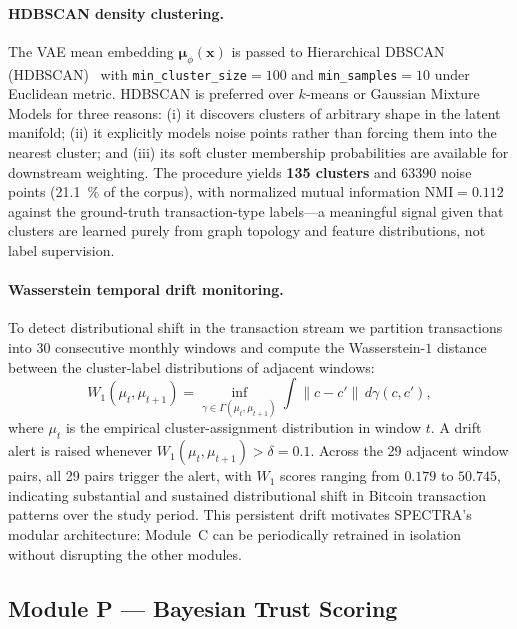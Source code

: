 \documentclass[journal]{IEEEtran}
\begin{document}
\paragraph{HDBSCAN density clustering.}
The VAE mean embedding $\boldsymbol{\mu}_\phi(\mathbf{x})$ is passed to
Hierarchical DBSCAN (HDBSCAN)~\cite{Campello2013} with
\texttt{min\_cluster\_size}$= 100$ and \texttt{min\_samples}$= 10$
under Euclidean metric.
HDBSCAN is preferred over $k$-means or Gaussian Mixture Models for three
reasons: (i) it discovers clusters of arbitrary shape in the latent manifold;
(ii) it explicitly models noise points rather than forcing them into the
nearest cluster; and (iii) its soft cluster membership probabilities are
available for downstream weighting.
The procedure yields \textbf{135 clusters} and
\num{63390} noise points (\SI{21.1}{\percent} of the corpus), with
normalized mutual information $\mathrm{NMI} = 0.112$ against the ground-truth
transaction-type labels—a meaningful signal given that clusters are learned
purely from graph topology and feature distributions, not label supervision.

\paragraph{Wasserstein temporal drift monitoring.}
To detect distributional shift in the transaction stream we partition
transactions into 30 consecutive monthly windows and compute the
Wasserstein-$1$ distance~\cite{Villani2009} between the cluster-label
distributions of adjacent windows:
\begin{equation}
  W_1(\mu_t, \mu_{t+1})
    = \inf_{\gamma \in \Gamma(\mu_t, \mu_{t+1})}
        \int \|c - c'\| \, d\gamma(c, c'),
  \label{eq:w1}
\end{equation}
where $\mu_t$ is the empirical cluster-assignment distribution in window $t$.
A drift alert is raised whenever $W_1(\mu_t, \mu_{t+1}) > \delta = 0.1$.
Across the 29 adjacent window pairs, all 29 pairs trigger the alert, with
$W_1$ scores ranging from $0.179$ to $50.745$, indicating substantial and
sustained distributional shift in Bitcoin transaction patterns over the
study period.
This persistent drift motivates SPECTRA's modular architecture: Module~C can
be periodically retrained in isolation without disrupting the other modules.

\subsection{Module P — Bayesian Trust Scoring}
\label{sec:module_p}
\end{document}
